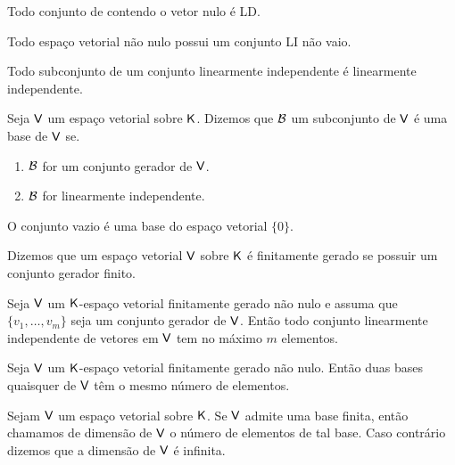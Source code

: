 \documentclass[10pt,a4paper]{book}
\begin{document}
\begin{lemma}
	Todo conjunto de contendo o vetor nulo é LD.
\end{lemma}

\begin{lemma}
	Todo espaço vetorial não nulo possui um conjunto LI não vaio.
\end{lemma}

\begin{lemma}
	Todo subconjunto de um conjunto linearmente independente é linearmente independente.
\end{lemma}

\begin{definition}
	Seja $\mathsf{ V }$ um espaço vetorial sobre $\mathsf{ K }$. Dizemos que $\mathcal{ B }$ um subconjunto de $\mathsf{ V }$ é uma base de $\mathsf{ V }$ se.
	\begin{enumerate}
		\item $\mathcal{ B }$ for um conjunto gerador de $\mathsf{ V }$.
		\item $\mathcal{ B }$ for linearmente independente.
	\end{enumerate}
\end{definition}

\begin{lemma}
	O conjunto vazio é uma base do espaço vetorial $\{ 0 \}$.
\end{lemma}

\begin{definition}
	Dizemos que um espaço vetorial $\mathsf{ V }$ sobre $\mathsf{ K }$ é finitamente gerado se possuir um conjunto gerador finito.
\end{definition}

\begin{proposition}
	Seja $\mathsf{ V }$ um $\mathsf{ K }$-espaço vetorial finitamente gerado não nulo e assuma que $\{ v_1, \dots, v_m\}$ seja um conjunto gerador de $\mathsf{ V }$. Então todo conjunto linearmente independente de vetores em $\mathsf{ V }$ tem no máximo $m$ elementos.
\end{proposition}

\begin{corollary}
	Seja $\mathsf{ V }$ um $\mathsf{ K }$-espaço vetorial finitamente gerado não nulo. Então duas bases quaisquer de $\mathsf{ V }$ têm o mesmo número de elementos.
\end{corollary}

\begin{definition}
	Sejam $\mathsf{ V }$ um espaço vetorial sobre $\mathsf{ K }$. Se $\mathsf{ V }$ admite uma base finita, então chamamos de dimensão de $\mathsf{ V }$ o número de elementos de tal base. Caso contrário dizemos que a dimensão de $\mathsf{ V }$ é infinita.
\end{definition}
\end{document}
